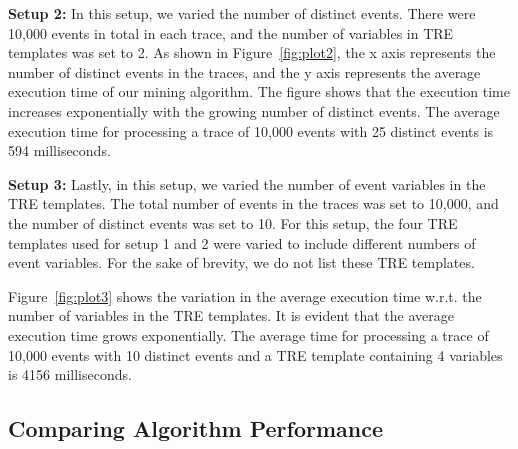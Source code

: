 \documentclass[]{sigplanconf}
\begin{document}
\vspace{3mm}

\noindent \textbf{Setup 2:}
In this setup, we varied the number of distinct events. There were 10,000 events in total in each trace, and the number of variables in TRE templates was set to 2. As shown in Figure~\ref{fig:plot2}, the x axis represents the number of distinct events in the traces, and the y axis represents the average execution time of our mining algorithm. The figure shows that the execution time increases exponentially with the growing number of distinct events. The average execution time for processing a trace of 10,000 events with 25 distinct events is 594 milliseconds.

\vspace{3mm}

\noindent \textbf{Setup 3:}
Lastly, in this setup, we varied the number of event variables in the TRE templates. The total number of events in the traces was set to 10,000, and the number of distinct events was set to 10. For this setup, the four TRE templates used for setup 1 and 2 were varied to include different numbers of event variables. For the sake of brevity, we do not list these TRE templates.

Figure~\ref{fig:plot3} shows the variation in the average execution time w.r.t. the number of variables in the TRE templates.
It is evident that the average execution time grows exponentially. The average time for processing a trace of 10,000 events with 10 distinct events and a TRE template containing 4 variables is 4156 milliseconds.

%

\subsection{Comparing Algorithm Performance}
\end{document}
